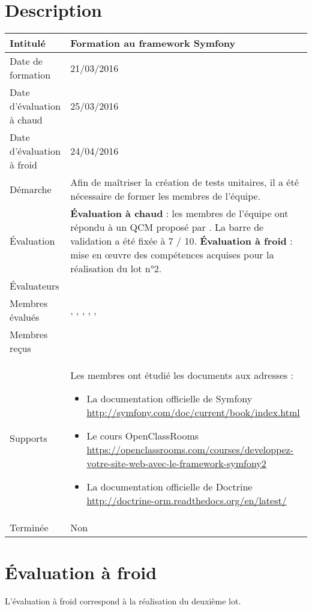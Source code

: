 \documentclass[asi, sansVersion]{picInsa}
\begin{document}
	\section*{Description}
		\begin{longtable}{|p{}|p{}|}
			\hline
			\cellcolor{gris2} Intitulé & Formation au framework Symfony\\\hline
			\cellcolor{gris2} Date de formation & 21/03/2016\\\hline
			\cellcolor{gris2} Date d'évaluation à chaud & 25/03/2016 \\\hline
			\cellcolor{gris2} Date d'évaluation à froid & 24/04/2016 \\\hline
			\cellcolor{gris2} Démarche & Afin de maîtriser la création de tests unitaires, il a été nécessaire de former les membres de l'équipe.\\\hline
			\cellcolor{gris2} Évaluation &
				\textbf{Évaluation à chaud} : les membres de l'équipe ont répondu à un QCM proposé par \Florian. La barre de validation a été fixée à 7 / 10.\newline
				\textbf{Évaluation à froid} : mise en œuvre des compétences acquises pour la réalisation du lot n°2.\\\hline
			\cellcolor{gris2} Évaluateurs & \Florian{}\\\hline
			\cellcolor{gris2} Membres évalués & \Melissa{}, \Michel{}, \Matthieu{}, \Mathieu{}, \Kafui{}, \Julie{}\\\hline
			\cellcolor{gris2} Membres reçus &  \\\hline
			\cellcolor{gris2} Supports & Les membres ont étudié les documents aux adresses : \begin{itemize}
			\item La documentation officielle de Symfony \url{http://symfony.com/doc/current/book/index.html}
                        \item Le cours OpenClassRooms \url{https://openclassrooms.com/courses/developpez-votre-site-web-avec-le-framework-symfony2}
                        \item La documentation officielle de Doctrine \url{http://doctrine-orm.readthedocs.org/en/latest/}
		\end{itemize}
			 \\\hline
			\cellcolor{gris2} Terminée & Non \\\hline
		\end{longtable}
	
	\newpage
	\section*{Évaluation à froid}
		L'évaluation à froid correspond à la réalisation du deuxième lot.
\end{document}
